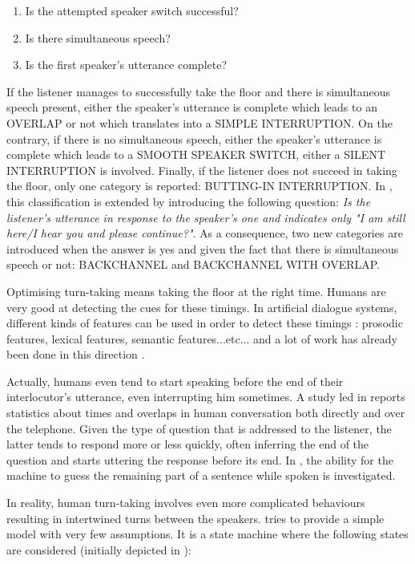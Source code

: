         \begin{enumerate}
            \item Is the attempted speaker switch successful?
            \item Is there simultaneous speech?
            \item Is the first speaker's utterance complete?
        \end{enumerate}
				
				If the listener manages to successfully take the floor and there is simultaneous speech present, either the speaker's utterance is complete which leads to an OVERLAP or not which translates into a SIMPLE INTERRUPTION. On the contrary, if there is no simultaneous speech, either the speaker's utterance is complete which leads to a SMOOTH SPEAKER SWITCH, either a SILENT INTERRUPTION is involved. Finally, if the listener does not succeed in taking the floor, only one category is reported: BUTTING-IN INTERRUPTION. In \cite{Gravano2011}, this classification is extended by introducing the following question: \textit{Is the listener's utterance in response to the speaker's one and indicates only "I am still here/I hear you and please continue?"}. As a consequence, two new categories are introduced when the answer is yes and given the fact that there is simultaneous speech or not: BACKCHANNEL and BACKCHANNEL WITH OVERLAP.
        
        Optimising turn-taking means taking the floor at the right time. Humans are very good at detecting the cues for these timings. In artificial dialogue systems, different kinds of features can be used in order to detect these timings \cite{Gravano2011}: prosodic features, lexical features, semantic features...etc... and a lot of work has already been done in this direction \cite{Raux2008,Jonsdottir2008,Meena2013}.

        Actually, humans even tend to start speaking before the end of their interlocutor's utterance, even interrupting him sometimes. A study led in \cite{Strombergsson2013} reports statistics about times and overlaps in human conversation both directly and over the telephone. Given the type of question that is addressed to the listener, the latter tends to respond more or less quickly, often inferring the end of the question and starts uttering the response before its end. In \cite{DeVault2011}, the ability for the machine to guess the remaining part of a sentence while spoken is investigated.
				
        In reality, human turn-taking involves even more complicated behaviours resulting in intertwined turns between the speakers. \cite{Raux2009} tries to provide a simple model with very few assumptions. It is a state machine where the following states are considered (initially depicted in \cite{Jaffe1970}):

